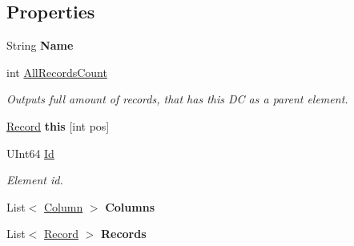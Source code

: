 \subsection*{Properties}
\begin{DoxyCompactItemize}
\item 
\hypertarget{class_dwarf_d_b_1_1_data_structures_1_1_data_container_ac285de692141c079be1bce8dccebb859}{
String {\bfseries Name}}
\label{class_dwarf_d_b_1_1_data_structures_1_1_data_container_ac285de692141c079be1bce8dccebb859}

\item 
int \hyperlink{class_dwarf_d_b_1_1_data_structures_1_1_data_container_af2f2d766cbb2729f91effb3c68fd97e0}{AllRecordsCount}
\begin{DoxyCompactList}\small\item\em Outputs full amount of records, that has this DC as a parent element. \item\end{DoxyCompactList}\item 
\hypertarget{class_dwarf_d_b_1_1_data_structures_1_1_data_container_a8b12c9bac22fa5ad7d007267f06e20c1}{
\hyperlink{class_dwarf_d_b_1_1_data_structures_1_1_record}{Record} {\bfseries this} \mbox{[}int pos\mbox{]}}
\label{class_dwarf_d_b_1_1_data_structures_1_1_data_container_a8b12c9bac22fa5ad7d007267f06e20c1}

\item 
UInt64 \hyperlink{class_dwarf_d_b_1_1_data_structures_1_1_data_container_a3e5849e957860912c9050dbd84818dfd}{Id}
\begin{DoxyCompactList}\small\item\em Element id. \item\end{DoxyCompactList}\item 
\hypertarget{class_dwarf_d_b_1_1_data_structures_1_1_data_container_a4b7bab104009e416ea771276c2e7161a}{
List$<$ \hyperlink{class_dwarf_d_b_1_1_data_structures_1_1_column}{Column} $>$ {\bfseries Columns}}
\label{class_dwarf_d_b_1_1_data_structures_1_1_data_container_a4b7bab104009e416ea771276c2e7161a}

\item 
\hypertarget{class_dwarf_d_b_1_1_data_structures_1_1_data_container_a04e95f117bfb96a32811e7bfeb6c7c32}{
List$<$ \hyperlink{class_dwarf_d_b_1_1_data_structures_1_1_record}{Record} $>$ {\bfseries Records}}
\label{class_dwarf_d_b_1_1_data_structures_1_1_data_container_a04e95f117bfb96a32811e7bfeb6c7c32}

\end{DoxyCompactItemize}



